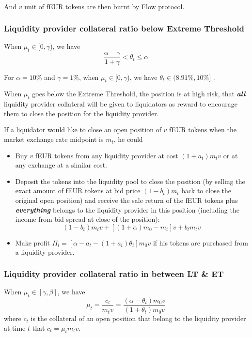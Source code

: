\documentclass{article}
\begin{document}
And $v$ unit of fEUR tokens are then burnt by Flow protocol.

\subsubsection{Liquidity provider collateral ratio below Extreme Threshold}
When  $\mu_t\in [0,\gamma$), we have
$$\frac{\alpha - \gamma}{1+ \gamma}<\theta_t \leq \alpha$$

For $\alpha = 10\%$ and $\gamma = 1\%$, when $\mu_t\in [0,\gamma$), we have $\theta_t \in (8.91\%, 10\%]$ .

When $\mu_t$ goes below the Extreme Threshold, the position is at high risk, that \textbf{\textit{all}} liquidity provider collateral will be given to liquidators as reward to encourage them to close the position for the liquidity provider.\par

If a liquidator would like to close an open position of $v$ fEUR tokens when the market exchange rate midpoint is $m_t$, he could

\begin{itemize}

    \item Buy $v$ fEUR tokens from any liquidity provider at cost $(1+a_t)m_t v$ or at any exchange at a similar cost. 
    
    \item Deposit the tokens into the liquidity pool to close the position (by selling the exact amount of fEUR tokens at bid price $(1-b_t)m_t$ back to close the original open position) and receive the sale return of the fEUR tokens plus \textbf{\textit{everything}} belongs to the liquidity provider in this position (including the income from bid spread at close of the position):
    $$(1-b_t)m_t v + [(1+\alpha)m_0 - m_t]v + b_t m_t v$$
    
    \item Make profit $\Pi_l=[\alpha - a_t - (1+a_t)\theta_t]m_0 v$ if his tokens are purchased from a liquidity provider.

\end{itemize}


\subsubsection{Liquidity provider collateral ratio in between LT \& ET}
When $\mu_t \in [\gamma,\beta]$, we have
$$\mu_t=\frac{c_t}{m_t v}=\frac{(\alpha - \theta_t)m_0 v}{(1+\theta_t)m_0 v}$$
where $c_t$ is the collateral of an open position that belong to the liquidity provider at time $t$ that $c_t=\mu_t m_t v$. 
\end{document}
